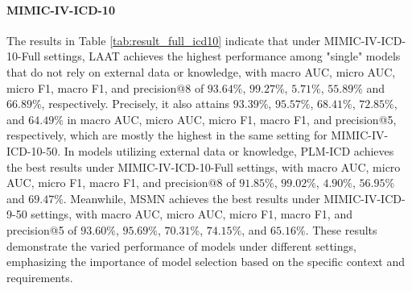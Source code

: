 \documentclass[11pt]{article}
\begin{document}
\paragraph{MIMIC-IV-ICD-10} The results in Table \ref{tab:result_full_icd10} indicate that under MIMIC-IV-ICD-10-Full settings, LAAT achieves the highest performance among "single" models that do not rely on external data or knowledge, with macro AUC, micro AUC, micro F1, macro F1, and precision@8 of $93.64\%$, $99.27\%$, $5.71\%$, $55.89\%$ and  $66.89\%$, respectively. Precisely, it also attains $93.39\%$, $95.57\%$, $68.41\%$, $72.85\%$, and $64.49\%$ in macro AUC, micro AUC, micro F1, macro F1, and precision@5, respectively, which are mostly the highest in the same setting for MIMIC-IV-ICD-10-50. In models utilizing external data or knowledge, PLM-ICD achieves the best results under MIMIC-IV-ICD-10-Full settings, with macro AUC, micro AUC, micro F1, macro F1, and precision@8 of $91.85\%$, $99.02 \%$, $4.90\%$, $56.95\% $ and $69.47\%$. Meanwhile, MSMN achieves the best results under MIMIC-IV-ICD-9-50 settings, with macro AUC, micro AUC, micro F1, macro F1, and precision@5 of $93.60\%$, $95.69\%$, $70.31\%$, $74.15\%$, and $65.16\%$. These results demonstrate the varied performance of models under different settings, emphasizing the importance of model selection based on the specific context and requirements.
\end{document}
